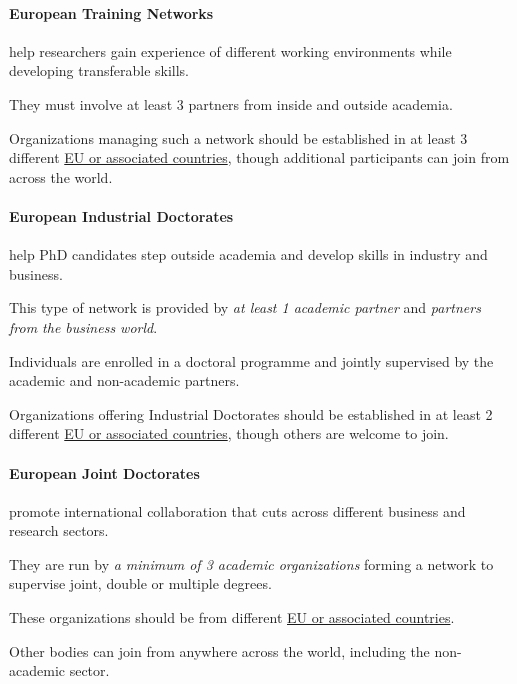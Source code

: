 \documentclass[oneside]{book}
\numberwithin{equation}{section}
\begin{document}
\paragraph{European Training Networks} help researchers gain experience of different working environments while developing transferable skills.

%
They must involve at least 3 partners from inside and outside academia.

Organizations managing such a network should be established in at least 3 different \href{http://ec.europa.eu/research/participants/data/ref/h2020/other/wp/2016-2017/annexes/h2020-wp1617-annex-a-countries-rules_en.pdf}{EU or associated countries}, though additional participants can join from across the world.

\paragraph{European Industrial Doctorates} help PhD candidates step outside academia and develop skills in industry and business.

%
This type of network is provided by \textit{at least 1 academic partner} and \textit{partners from the business world}.

Individuals are enrolled in a doctoral programme and jointly supervised by the academic and non-academic partners.

%
Organizations offering Industrial Doctorates should be established in at least 2 different \href{http://ec.europa.eu/research/participants/data/ref/h2020/other/wp/2016-2017/annexes/h2020-wp1617-annex-a-countries-rules_en.pdf}{EU or associated countries}, though others are welcome to join.

\paragraph{European Joint Doctorates} promote international collaboration that cuts across different business and research sectors.

%
They are run by \textit{a minimum of 3 academic organizations} forming a network to supervise joint, double or multiple degrees.

These organizations should be from different \href{http://ec.europa.eu/research/participants/data/ref/h2020/other/wp/2016-2017/annexes/h2020-wp1617-annex-a-countries-rules_en.pdf}{EU or associated countries}.

Other bodies can join from anywhere across the world, including the non-academic sector.
\end{document}
